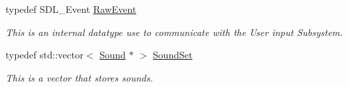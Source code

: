 \begin{DoxyCompactItemize}
typedef SDL\_\-Event \hyperlink{namespacephys_a8126d26e4507e66d09876988bb941fd4}{RawEvent}
\begin{DoxyCompactList}\small\item\em This is an internal datatype use to communicate with the User input Subsystem. \item\end{DoxyCompactList}\item 
typedef std::vector$<$ \hyperlink{classphys_1_1Sound}{Sound} $\ast$ $>$ \hyperlink{namespacephys_ab780c3162da5699fe421f3739ba03fc4}{SoundSet}
\begin{DoxyCompactList}\small\item\em This is a vector that stores sounds. \item\end{DoxyCompactList}\end{DoxyCompactItemize}
